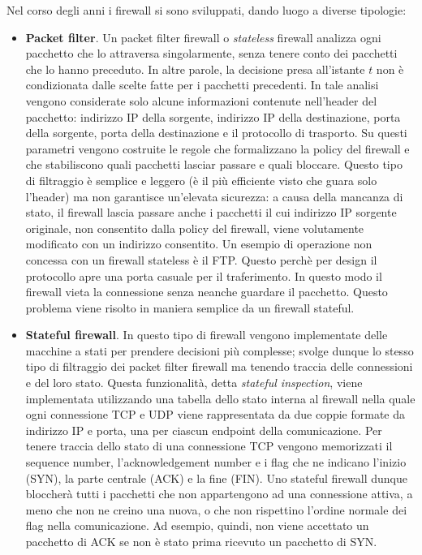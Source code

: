 Nel corso degli anni i firewall si sono sviluppati, dando luogo a diverse tipologie:
\begin{itemize}
	\item \textbf{Packet filter}. Un packet filter firewall o \textit{stateless} firewall analizza ogni pacchetto che lo attraversa singolarmente, senza tenere conto dei pacchetti che lo hanno preceduto. In altre parole, la decisione presa all'istante $t$ non è condizionata dalle scelte fatte per i pacchetti precedenti. In tale analisi vengono considerate solo alcune informazioni contenute nell'header del pacchetto: indirizzo IP della sorgente, indirizzo IP della destinazione, porta della sorgente, porta della destinazione e il protocollo di trasporto. Su questi parametri vengono costruite le regole che formalizzano la policy del firewall e che stabiliscono quali pacchetti lasciar passare e quali bloccare. Questo tipo di filtraggio è semplice e leggero (è il più efficiente visto che guara solo l'header) ma non garantisce un'elevata sicurezza: a causa della mancanza di stato, il firewall lascia passare anche i pacchetti il cui indirizzo IP sorgente originale, non consentito dalla policy del firewall, viene volutamente modificato con un indirizzo consentito. Un esempio di operazione non concessa con un firewall stateless è il FTP. Questo perchè per design il protocollo apre una porta casuale per il traferimento. In questo modo il firewall vieta la connessione senza neanche guardare il pacchetto. Questo problema viene risolto in maniera semplice da un firewall stateful.
	\item \textbf{Stateful firewall}. In questo tipo di firewall vengono implementate delle macchine a stati per prendere decisioni più complesse; svolge dunque lo stesso tipo di filtraggio dei packet filter firewall ma tenendo traccia delle connessioni e del loro stato. Questa funzionalità, detta \textit{stateful inspection}, viene implementata utilizzando una tabella dello stato interna al firewall nella quale ogni connessione TCP e UDP viene rappresentata da due coppie formate da indirizzo IP e porta, una per ciascun endpoint della comunicazione. Per tenere traccia dello stato di una connessione TCP vengono memorizzati il sequence number, l'acknowledgement number e i flag che ne indicano l'inizio (SYN), la parte centrale (ACK) e la fine (FIN).  Uno stateful firewall dunque bloccherà tutti i pacchetti che non appartengono ad una connessione attiva, a meno che non ne creino una nuova, o che non rispettino l'ordine normale dei flag nella comunicazione. Ad esempio, quindi, non viene accettato un pacchetto di ACK se non è stato prima ricevuto un pacchetto di SYN. \\

\end{itemize}
